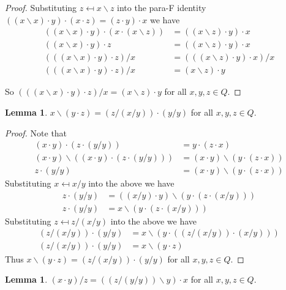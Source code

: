 \documentclass[12pt]{report}
\theoremstyle{definition}
\newtheorem{lem}[thm]{Lemma}
\newcommand{\ldv}{\backslash}       %
\begin{document}
\begin{proof}
  Substituting $z \mapsfrom x\ldv z$ into the para-F identity
    $((x\ldv x)\cdot y)\cdot(x\cdot z) = (z\cdot y)\cdot x$ we have
  \begin{align*}
    ((x\ldv x)\cdot y)\cdot (x\cdot (x\ldv z)) &= ((x\ldv z)\cdot y)\cdot x\\
    ((x\ldv x)\cdot y)\cdot z &= ((x\ldv z)\cdot y)\cdot x\\
    (((x\ldv x)\cdot y)\cdot z)/x &= (((x\ldv z)\cdot y)\cdot x)/x\\
    (((x\ldv x)\cdot y)\cdot z)/x &= (x\ldv z)\cdot y
  \end{align*}

  So $(((x\ldv x)\cdot y)\cdot z)/x = (x\ldv z)\cdot y$ for all $x, y, z\in Q$.
\end{proof}

\begin{lem}\label{M-25}
  $x\ldv(y\cdot z) = (z/(x/y))\cdot(y/y)$ for all $x, y, z\in Q$.
\end{lem}

\begin{proof}
  Note that
  \begin{align*}
    (x\cdot y)\cdot(z\cdot(y/y)) &= y\cdot (z\cdot x)\\
    (x\cdot y)\ldv ((x\cdot y)\cdot(z\cdot(y/y))) &= (x\cdot y)\ldv(y\cdot (z\cdot x))\\
    z\cdot (y/y) &= (x\cdot y)\ldv(y\cdot (z\cdot x))
  \end{align*}
  Substituting $x \mapsfrom x/y$ into the above we have
  \begin{align*}
    z\cdot(y/y) &= ((x/y)\cdot y)\ldv (y\cdot (z\cdot (x/y)))\\
    z\cdot (y/y) &= x\ldv (y\cdot (z\cdot (x/y)))
  \end{align*}
  Substituting $z \mapsfrom z/(x/y)$ into the above we have
  \begin{align*}
    (z/(x/y))\cdot(y/y) &= x\ldv(y\cdot ((z/(x/y))\cdot (x/y)))\\
    (z/(x/y))\cdot(y/y) &= x\ldv(y\cdot z)
  \end{align*}
  Thus $x\ldv(y\cdot z) = (z/(x/y))\cdot (y/y)$ for all $x, y, z\in Q$.
\end{proof}

\begin{lem}\label{M-27}
  $(x\cdot y)/z = ((z/(y/y))\ldv y)\cdot x$ for all $x, y, z\in Q$.
\end{lem}
\end{document}
